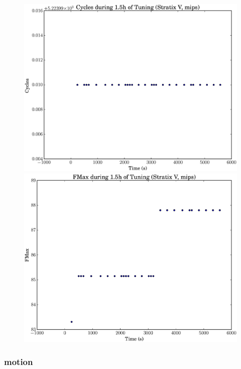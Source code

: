 \documentclass[12pt, a4paper]{article}
\begin{document}
\begin{figure}[htpb]
    \begin{minipage}{.48\textwidth}
        \includegraphics[scale=.25]{mips_cycles_5400_chstone_StratixV}
    \end{minipage}%
    \hfill
    \begin{minipage}{.48\textwidth}
        \includegraphics[scale=.25]{mips_fmax_5400_chstone_StratixV}
    \end{minipage}%
\end{figure}

\newpage

\subsubsection{motion}
\end{document}
